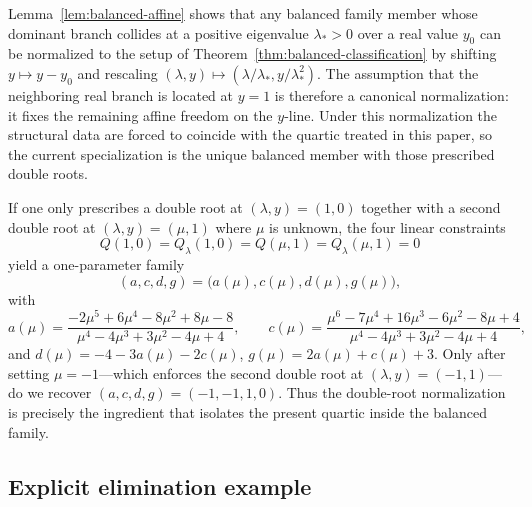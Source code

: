 \begin{remark}\label{rem:canonical-normalization}
Lemma~\ref{lem:balanced-affine} shows that any balanced family member whose dominant branch collides at a positive eigenvalue $\lambda_*>0$ over a real value $y_0$ can be normalized to the setup of Theorem~\ref{thm:balanced-classification} by shifting $y\mapsto y-y_0$ and rescaling $(\lambda,y)\mapsto (\lambda/\lambda_*,y/\lambda_*^2)$.
The assumption that the neighboring real branch is located at $y=1$ is therefore a canonical normalization: it fixes the remaining affine freedom on the $y$-line.
Under this normalization the structural data are forced to coincide with the quartic treated in this paper, so the current specialization is the unique balanced member with those prescribed double roots.
\end{remark}

\begin{remark}\label{rem:mu-parameter}
If one only prescribes a double root at $(\lambda,y)=(1,0)$ together with a second double root at $(\lambda,y)=(\mu,1)$ where $\mu$ is unknown, the four linear constraints
\[
Q(1,0)=Q_\lambda(1,0)=Q(\mu,1)=Q_\lambda(\mu,1)=0
\]
yield a one-parameter family
\[
(a,c,d,g)=\bigl(a(\mu),c(\mu),d(\mu),g(\mu)\bigr),
\]
with
\[
a(\mu)=\frac{-2 \mu^5+6 \mu^4-8 \mu^2+8 \mu-8}{\mu^4-4 \mu^3+3 \mu^2-4 \mu+4},
\qquad
c(\mu)=\frac{\mu^6-7 \mu^4+16 \mu^3-6 \mu^2-8 \mu+4}{\mu^4-4 \mu^3+3 \mu^2-4 \mu+4},
\]
and $d(\mu)=-4-3a(\mu)-2c(\mu)$, $g(\mu)=2a(\mu)+c(\mu)+3$.
Only after setting $\mu=-1$---which enforces the second double root at $(\lambda,y)=(-1,1)$---do we recover $(a,c,d,g)=(-1,-1,1,0)$.
Thus the double-root normalization is precisely the ingredient that isolates the present quartic inside the balanced family.
\end{remark}

\subsection{Explicit elimination example}

